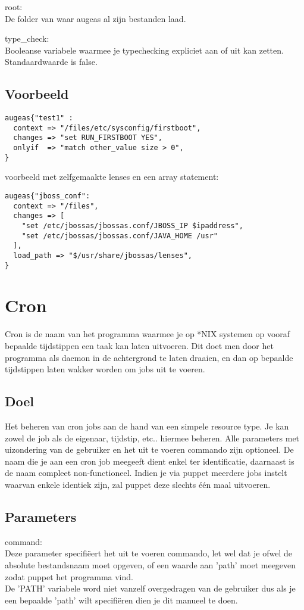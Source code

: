 root:\\
De folder van waar augeas al zijn bestanden laad.

type\_check:\\
Booleanse variabele waarmee je typechecking expliciet aan of uit kan zetten. Standaardwaarde is false.

\subsection{Voorbeeld}
\begin{lstlisting}
augeas{"test1" :
  context => "/files/etc/sysconfig/firstboot",
  changes => "set RUN_FIRSTBOOT YES",
  onlyif  => "match other_value size > 0",
}
\end{lstlisting}

voorbeeld met zelfgemaakte lenses en een array statement:
\begin{lstlisting}
augeas{"jboss_conf":
  context => "/files",
  changes => [
    "set /etc/jbossas/jbossas.conf/JBOSS_IP $ipaddress",
    "set /etc/jbossas/jbossas.conf/JAVA_HOME /usr"
  ],
  load_path => "$/usr/share/jbossas/lenses",
}
\end{lstlisting}

\section{Cron}
Cron is de naam van het programma waarmee je op *NIX systemen op vooraf bepaalde tijdstippen een taak kan laten uitvoeren. Dit doet men door het programma als daemon in de achtergrond te laten draaien, en dan op bepaalde tijdstippen laten wakker worden om jobs uit te voeren.

\subsection{Doel}
Het beheren van cron jobs aan de hand van een simpele resource type. Je kan zowel de job als de eigenaar, tijdstip, etc.. hiermee beheren. Alle parameters met uizondering van de gebruiker en het uit te voeren commando zijn optioneel. De naam die je aan een cron job meegeeft dient enkel ter identificatie, daarnaast is de naam compleet non-functioneel. Indien je via puppet meerdere jobs instelt waarvan enkele identiek zijn, zal puppet deze slechts \'{e}\'{e}n maal uitvoeren.

\subsection{Parameters}
command:\\
Deze parameter specifi\"{e}ert het uit te voeren commando, let wel dat je ofwel de absolute bestandsnaam moet opgeven, of een waarde aan 'path' moet meegeven zodat puppet het programma vind.\\
De 'PATH' variabele word niet vanzelf overgedragen van de gebruiker dus als je een bepaalde 'path' wilt specifi\"{e}ren dien je dit manueel te doen.\\

